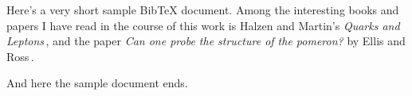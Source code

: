\documentclass[12pt]{report}
\begin{document}
Here's a very short sample BibTeX document. Among the interesting books and
papers I have read in the course of this work is Halzen and Martin's
{\it Quarks and Leptons}\,\cite{Halzen:1984mc}, and the paper {\it Can
one probe the structure of the pomeron?} by Ellis and
Ross\,\cite{Ellis:1996cg}.

And here the sample document ends.



\end{document}
